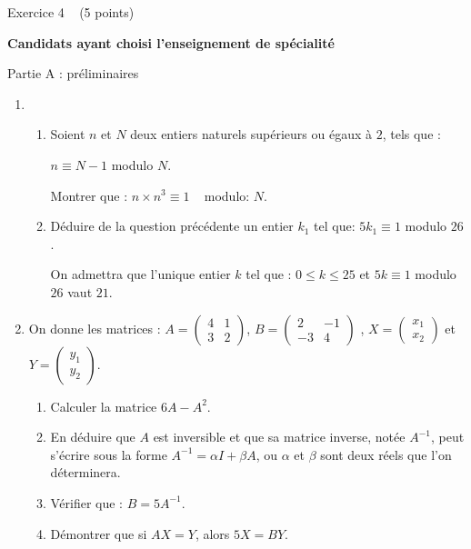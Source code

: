 
%
\begin{h2}Exercice 4   (5 points)\end{h2}
\textbf{Candidats ayant choisi l'enseignement de spécialité}
\begin{h3}Partie A : préliminaires\end{h3}
\begin{enumerate}
     \item
     \begin{enumerate}[label=\alph*.]
          \item
          Soient $n$ et $N$ deux entiers naturels supérieurs ou égaux à $2$, tels que :
\par
$ n \equiv  N -1 $ modulo $ N$. 
\par
          Montrer que : $ n \times   n^{3} \equiv  1 $     modulo: $N$.
          \item
          Déduire de la question précédente un entier $k_{1}$ tel que: 
$ 5k_{1} \equiv  1 $ modulo $ 26 $. 
          \par
     On admettra que l'unique entier $k$ tel que : $ 0 \leqslant  k \leqslant   25$ et $ 5k \equiv  1 $ modulo $ 26 $ vaut $ 21 $.
\end{enumerate}
     \item
     On donne les matrices : $A=\begin{pmatrix} 4  & 1 \\ 3 &  2 \end{pmatrix}$,  $B=\begin{pmatrix}  2  & -1 \\ -3   &  4 \end{pmatrix}$ ,  $X=\begin{pmatrix}x_{1} \\ x_{2} \end{pmatrix}$ et $Y=\begin{pmatrix} y_{1} \\ y_{2} \end{pmatrix}$.
     \begin{enumerate}[label=\alph*.]
          \item
          Calculer la matrice $6A-A^{2}$.
          \item
          En déduire que $A$ est inversible et que sa matrice inverse, notée $A^{-1}$, peut s'écrire sous la  forme $A^{-1}=\alpha  I+\beta  A$, ou $\alpha $ et $\beta $ sont deux réels que l'on  déterminera.
          \item
          Vérifier que : $B=5A^{-1}$.
          \item
     Démontrer que si $A X=Y$, alors $5X=B Y$.\end{enumerate}
\end{enumerate}
